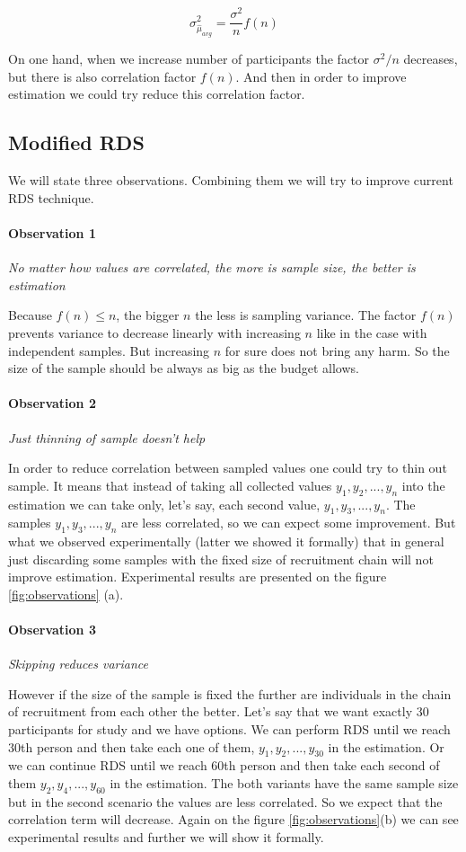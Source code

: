 \documentclass[12pt]{report}
\begin{document}
$$ \sigma^2_{\hat{\mu}_{avg}} = \frac{\sigma^2}{n} f(n)$$

On one hand, when we increase number of participants the factor $\sigma^2/n$ decreases, but there is also correlation factor $f(n)$. And then in order to improve estimation we could try reduce this correlation factor.

\subsection{Modified RDS}

We will state three observations. Combining them we will try to improve current RDS technique.

\paragraph{Observation 1} \textit{No matter how values are correlated, the more is sample size, the better is estimation}

Because $f(n) \leq n$,  the bigger $n$ the less is sampling variance. The factor $f(n)$ prevents variance to decrease linearly with increasing $n$ like in the case with independent samples. But increasing $n$ for sure does not bring any harm. So the size of the sample should be always as big as the budget allows.


\paragraph{Observation 2} \textit{Just thinning of sample doesn't help}

In order to reduce correlation between sampled values one could try to thin out sample. It means that instead of taking all collected values $y_1, y_2, ..., y_n$ into the estimation we can take only, let's say, each second value, $y_1, y_3, ..., y_n$. The samples $y_1, y_3, ..., y_n$ are less correlated, so we can expect some improvement. But what we observed experimentally (latter we showed it formally) that in general just discarding some samples with the fixed size of recruitment chain will not improve estimation. Experimental results are presented on the figure \ref{fig:observations} (a).

\paragraph{Observation 3} \textit{Skipping reduces variance}

However if the size of the sample is fixed the further are individuals in the chain of recruitment from each other the better. Let's say that we want exactly 30 participants for study and we have options. We can perform RDS until we reach 30th person and then take each one of them, $y_1, y_2, ..., y_{30}$ in the estimation. Or we can continue RDS until we reach 60th person and then take each second of them $y_2, y_4, ..., y_{60}$ in the estimation. The both variants have the same sample size but in the second scenario the values are less correlated. So we expect that the correlation term will decrease. Again on the figure \ref{fig:observations}(b) we can see experimental results and further we will show it formally.
\end{document}
